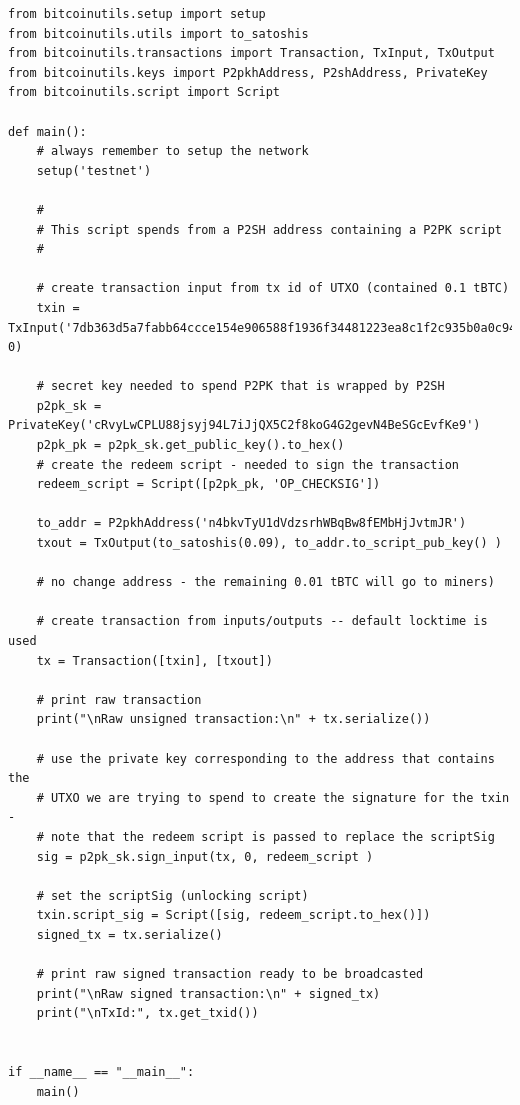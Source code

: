 \vspace{1em}
\begin{lstlisting}[style=Python]
from bitcoinutils.setup import setup
from bitcoinutils.utils import to_satoshis
from bitcoinutils.transactions import Transaction, TxInput, TxOutput
from bitcoinutils.keys import P2pkhAddress, P2shAddress, PrivateKey
from bitcoinutils.script import Script

def main():
    # always remember to setup the network
    setup('testnet')

    #
    # This script spends from a P2SH address containing a P2PK script
    #

    # create transaction input from tx id of UTXO (contained 0.1 tBTC)
    txin = TxInput('7db363d5a7fabb64ccce154e906588f1936f34481223ea8c1f2c935b0a0c945b', 0)

    # secret key needed to spend P2PK that is wrapped by P2SH
    p2pk_sk = PrivateKey('cRvyLwCPLU88jsyj94L7iJjQX5C2f8koG4G2gevN4BeSGcEvfKe9')
    p2pk_pk = p2pk_sk.get_public_key().to_hex()
    # create the redeem script - needed to sign the transaction
    redeem_script = Script([p2pk_pk, 'OP_CHECKSIG'])

    to_addr = P2pkhAddress('n4bkvTyU1dVdzsrhWBqBw8fEMbHjJvtmJR')
    txout = TxOutput(to_satoshis(0.09), to_addr.to_script_pub_key() )

    # no change address - the remaining 0.01 tBTC will go to miners)

    # create transaction from inputs/outputs -- default locktime is used
    tx = Transaction([txin], [txout])

    # print raw transaction
    print("\nRaw unsigned transaction:\n" + tx.serialize())

    # use the private key corresponding to the address that contains the
    # UTXO we are trying to spend to create the signature for the txin -
    # note that the redeem script is passed to replace the scriptSig
    sig = p2pk_sk.sign_input(tx, 0, redeem_script )

    # set the scriptSig (unlocking script)
    txin.script_sig = Script([sig, redeem_script.to_hex()])
    signed_tx = tx.serialize()

    # print raw signed transaction ready to be broadcasted
    print("\nRaw signed transaction:\n" + signed_tx)
    print("\nTxId:", tx.get_txid())


if __name__ == "__main__":
    main()
\end{lstlisting}
\vspace{1em}

